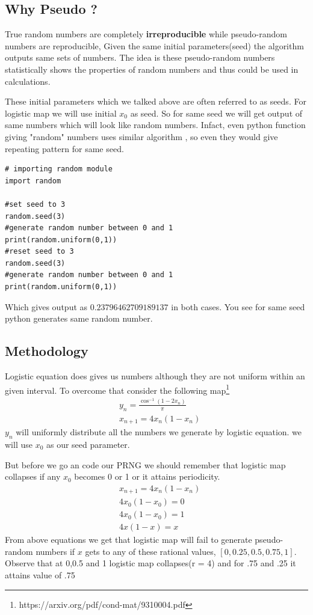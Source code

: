 \documentclass{report}
\begin{document}
\subsection{Why Pseudo ?}
True random numbers are completely \textbf{irreproducible} while pseudo-random numbers are reproducible, Given the same initial parameters(seed) the algorithm outputs same sets of numbers. The idea is these pseudo-random numbers statistically shows the properties of random numbers and thus could be used in calculations.
\newline

These initial parameters which we talked above are often referred to as seeds. For logistic map we will use initial $x_0$ as seed. So for same seed we will get output of same  numbers which will look like random numbers. Infact, even python function giving "random" numbers uses similar algorithm , so even they would give repeating pattern for same seed.

\begin{lstlisting}
# importing random module
import random

#set seed to 3
random.seed(3)
#generate random number between 0 and 1
print(random.uniform(0,1))
#reset seed to 3
random.seed(3)
#generate random number between 0 and 1
print(random.uniform(0,1))
\end{lstlisting}

Which gives output as $0.23796462709189137$ in both cases. You see for same seed python generates same random number.
\newpage

\subsection{Methodology}
Logistic equation does gives us numbers although they are not uniform within an given interval. To overcome that consider the following map\footnote[1]{https://arxiv.org/pdf/cond-mat/9310004.pdf}
\begin{align}
    &y_n = \frac{\cos^{-1}(1-2x_n)}{\pi}  \\
    &x_{n+1} = 4x_n(1-x_n) \nonumber
\end{align}
$y_n$ will uniformly distribute all the numbers we generate by logistic equation. we will use $x_0$ as our seed parameter.

But before we go an code our PRNG we should remember that logistic map collapses if any $x_0$ becomes 0 or 1 or it attains periodicity.
\begin{align}
    &x_{n+1} = 4x_n(1-x_n) \nonumber \\
    &4x_0(1-x_0) = 0 \nonumber \\
    &4x_0(1-x_0) = 1 \nonumber \\
    &4x(1-x) = x \nonumber
\end{align}
From above equations we get that logistic map will fail to generate pseudo-random numbers if $x$ gets to any of these rational values, $[0 , 0.25 , 0.5 , 0.75 , 1 ]$. Observe that at 0,0.5 and 1 logistic map collapses(r = 4) and for .75 and .25 it attains value of .75
\end{document}
